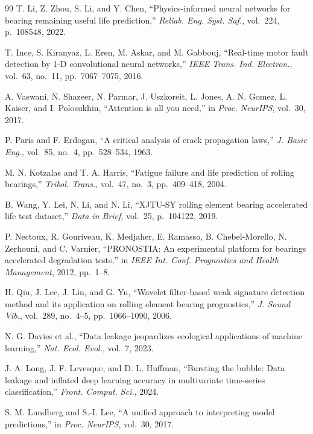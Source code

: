 \documentclass[5p,twocolumn]{elsarticle}
\begin{document}
\begin{thebibliography}{99}
T. Li, Z. Zhou, S. Li, and Y. Chen,
``Physics-informed neural networks for bearing remaining useful life prediction,''
\textit{Reliab. Eng. Syst. Saf.}, vol.~224, p.~108548, 2022.

T. Ince, S. Kiranyaz, L. Eren, M. Askar, and M. Gabbouj,
``Real-time motor fault detection by 1-D convolutional neural networks,''
\textit{IEEE Trans. Ind. Electron.}, vol.~63, no.~11, pp.~7067--7075, 2016.

A. Vaswani, N. Shazeer, N. Parmar, J. Uszkoreit, L. Jones, A. N. Gomez, L. Kaiser, and I. Polosukhin,
``Attention is all you need,''
in \textit{Proc. NeurIPS}, vol.~30, 2017.

P. Paris and F. Erdogan,
``A critical analysis of crack propagation laws,''
\textit{J. Basic Eng.}, vol.~85, no.~4, pp.~528--534, 1963.

M. N. Kotzalas and T. A. Harris,
``Fatigue failure and life prediction of rolling bearings,''
\textit{Tribol. Trans.}, vol.~47, no.~3, pp.~409--418, 2004.

B. Wang, Y. Lei, N. Li, and N. Li,
``XJTU-SY rolling element bearing accelerated life test dataset,''
\textit{Data in Brief}, vol.~25, p.~104122, 2019.

P. Nectoux, R. Gouriveau, K. Medjaher, E. Ramasso, B. Chebel-Morello, N. Zerhouni, and C. Varnier,
``PRONOSTIA: An experimental platform for bearings accelerated degradation tests,''
in \textit{IEEE Int. Conf. Prognostics and Health Management}, 2012, pp.~1--8.

H. Qiu, J. Lee, J. Lin, and G. Yu,
``Wavelet filter-based weak signature detection method and its application on rolling element bearing prognostics,''
\textit{J. Sound Vib.}, vol.~289, no.~4--5, pp.~1066--1090, 2006.

N. G. Davies et al.,
``Data leakage jeopardizes ecological applications of machine learning,''
\textit{Nat. Ecol. Evol.}, vol.~7, 2023.

J. A. Long, J. F. Levesque, and D. L. Huffman,
``Bursting the bubble: Data leakage and inflated deep learning accuracy in multivariate time-series classification,''
\textit{Front. Comput. Sci.}, 2024.

S. M. Lundberg and S.-I. Lee,
``A unified approach to interpreting model predictions,''
in \textit{Proc. NeurIPS}, vol.~30, 2017.

\end{thebibliography}
\end{document}
